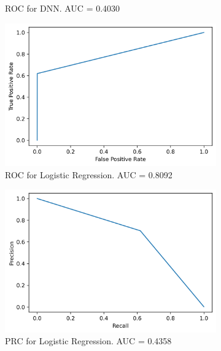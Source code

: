 \documentclass[utf8x]{ctexart}
\begin{document}
\begin{figure}[htb]
\begin{subfigure}[b]{0.48\textwidth}
    \caption{ROC for DNN. AUC = 0.4030}
    \label{fig:dnn_orc}
  \end{subfigure}
  \begin{subfigure}[b]{0.48\textwidth}
    \centering
    \includegraphics[width=\textwidth]{./images/reg_roc.png}
    \caption{ROC for Logistic Regression. AUC = 0.8092}
    \label{fig:reg_roc}
  \end{subfigure}
  \begin{subfigure}[b]{0.48\textwidth}
    \centering
    \includegraphics[width=\textwidth]{./images/reg_prc.png}
    \caption{PRC for Logistic Regression. AUC = 0.4358}
    \label{fig:reg_prc}
  \end{subfigure}
  \begin{subfigure}[b]{0.48\textwidth}
    \centering

\end{subfigure}
\end{figure}
\end{document}
